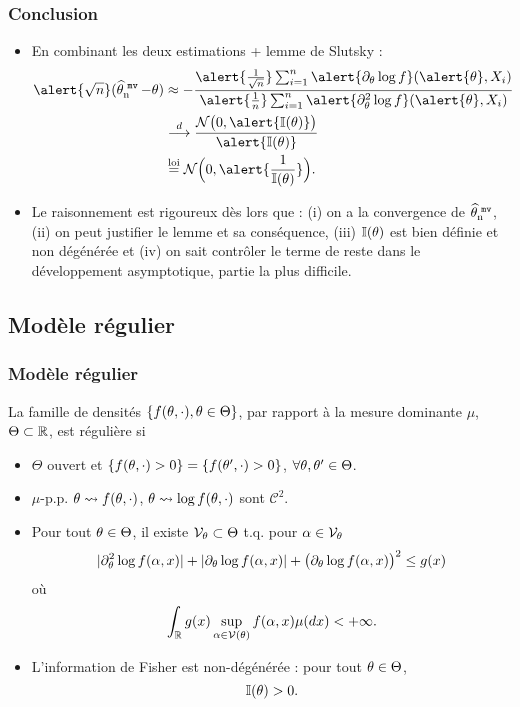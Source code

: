 \begin{frame}
\frametitle{Conclusion}
\begin{itemize}
\item En combinant les deux estimations + lemme de Slutsky :
\begin{align*}
\alert{\sqrt{n}}(\estMV-\truetheta) & \approx -\frac{\alert{\frac{1}{\sqrt{n}}}\sum_{i = 1}^n \alert{\partial_\truetheta \log f}(\alert{\truetheta}, X_i)}{\alert{\frac{1}{n}} \sum_{i = 1}^n \alert{\partial^2_\truetheta \log f}(\alert{\truetheta}, X_i)}\\
& \stackrel{d}{\longrightarrow} \frac{{\mathcal N}\big(0,\alert{\mathbb{I}(\truetheta)}\big)}{\alert{\mathbb{I}(\truetheta)}} \\
& \stackrel{\text{loi}}{=} {\mathcal N}\Big(0,\alert{\frac{1}{\mathbb{I}(\truetheta)}}\Big).
\end{align*}
\item Le raisonnement est \alert{ rigoureux dès lors que} : (i) on a la convergence de $\operatorname{\widehat \theta_n^{\,\,{\tt mv}}}$, (ii) on peut justifier le lemme et sa conséquence, (iii) $\mathbb{I}(\theta)$ est bien définie et non dégénérée et (iv) on sait contrôler le terme de reste dans le développement asymptotique, \alert{partie la plus difficile}.
\end{itemize}
\end{frame}

\subsection{Modèle régulier}

\begin{frame}
\frametitle{Modèle régulier}
\begin{df} La famille de densités $\{f(\theta,\cdot),\theta \in \Theta\}$,  par rapport à la mesure dominante $\mu$, $\Theta \subset \operatorname{{\mathbb R}}$, est \alert{régulière} si
\begin{itemize}
\item $\Theta$ ouvert et $\{f(\theta, \cdot)>0\}=\{f(\theta', \cdot)>0\}$, $\forall \theta, \theta' \in \Theta$.
\item $\mu$-p.p. $\theta \leadsto f(\theta,\cdot)$, $\theta \leadsto \log f(\theta,\cdot)$ sont ${\mathcal C}^2$.
 \item Pour tout $\theta \in \Theta$, il existe ${\mathcal V}_\theta \subset \Theta$ t.q. pour $\alpha \in {\mathcal V}_\theta$
$$|\partial_\theta^{2}\log f(\alpha,x)|+|\partial_\theta \log f(\alpha,x)|+\big(\partial_\theta\log f(\alpha,x)\big)^2\leq g(x)$$
où
$$\int_{\mathbb{R}}g(x)\sup_{\alpha \in {\mathcal V}(\theta)}f(\alpha,x)\mu(dx)<+\infty.$$
\item L'information de Fisher est non-dégénérée : pour tout $\theta \in \Theta$,
$$\mathbb{I}(\theta) >0.$$
\end{itemize}
\end{df}
\end{frame}

